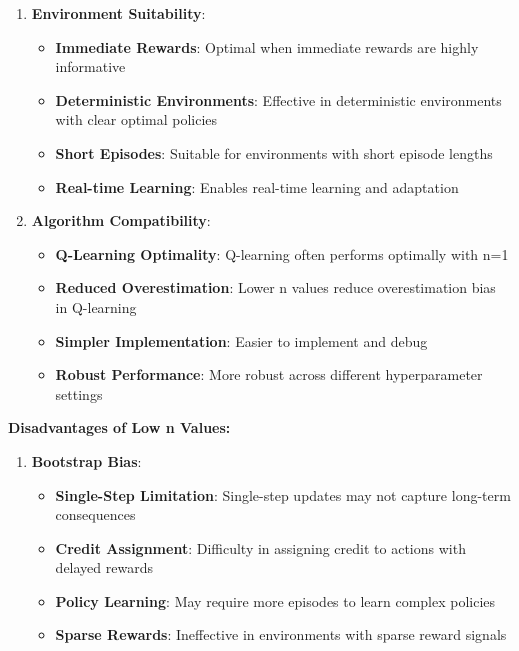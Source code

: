 \documentclass[12pt]{article}
\begin{document}
{{{\begin{enumerate}
    \item \textbf{Environment Suitability}:
    \begin{itemize}
        \item \textbf{Immediate Rewards}: Optimal when immediate rewards are highly informative
        \item \textbf{Deterministic Environments}: Effective in deterministic environments with clear optimal policies
        \item \textbf{Short Episodes}: Suitable for environments with short episode lengths
        \item \textbf{Real-time Learning}: Enables real-time learning and adaptation
    \end{itemize}
    
    \item \textbf{Algorithm Compatibility}:
    \begin{itemize}
        \item \textbf{Q-Learning Optimality}: Q-learning often performs optimally with n=1
        \item \textbf{Reduced Overestimation}: Lower n values reduce overestimation bias in Q-learning
        \item \textbf{Simpler Implementation}: Easier to implement and debug
        \item \textbf{Robust Performance}: More robust across different hyperparameter settings
    \end{itemize}
\end{enumerate}

\textbf{Disadvantages of Low n Values:}

\begin{enumerate}
    \item \textbf{Bootstrap Bias}:
    \begin{itemize}
        \item \textbf{Single-Step Limitation}: Single-step updates may not capture long-term consequences
        \item \textbf{Credit Assignment}: Difficulty in assigning credit to actions with delayed rewards
        \item \textbf{Policy Learning}: May require more episodes to learn complex policies
        \item \textbf{Sparse Rewards}: Ineffective in environments with sparse reward signals
    \end{itemize}
    

\end{enumerate}}}}
\end{document}
